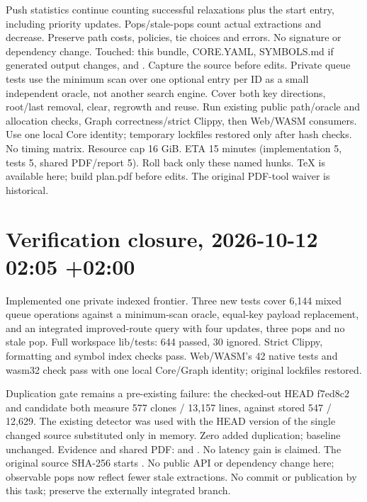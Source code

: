 \documentclass[11pt]{article}
\begin{document}
Push statistics continue counting successful relaxations plus the start entry,
including priority updates. Pops/stale-pops count actual extractions and decrease.
Preserve path costs, policies, tie choices and errors. No signature or dependency
change. Touched: this bundle, CORE.YAML, SYMBOLS.md if generated output changes,
and . Capture the source before edits.
Private queue tests use the minimum scan over one optional entry per ID as a
small independent oracle, not another search engine. Cover both key directions,
root/last removal, clear, regrowth and reuse. Run existing public path/oracle and
allocation checks, Graph correctness/strict Clippy, then Web/WASM consumers.
Use one local Core identity; temporary lockfiles restored only after hash checks.
No timing matrix. Resource cap 16 GiB. ETA 15 minutes (implementation 5, tests 5,
shared PDF/report 5). Roll back only these named hunks. TeX is available here;
build plan.pdf before edits. The original PDF-tool waiver is historical.

\section*{Verification closure, 2026-10-12 02:05 +02:00}
Implemented one private indexed frontier. Three new tests cover 6,144 mixed
queue operations against a minimum-scan oracle, equal-key payload replacement,
and an integrated improved-route query with four updates, three pops and no
stale pop. Full workspace lib/tests: 644 passed, 30 ignored. Strict Clippy,
formatting and symbol index checks pass. Web/WASM's 42 native tests and wasm32
check pass with one local Core/Graph identity; original lockfiles restored.

Duplication gate remains a pre-existing failure: the checked-out HEAD f7ed8c2 and
candidate both measure 577 clones / 13,157 lines, against stored 547 / 12,629.
The existing detector was used with the HEAD version of the single changed
source substituted only in memory. Zero added duplication; baseline unchanged.
Evidence and shared PDF:  and
. No latency gain is claimed.
The original source SHA-256 starts . No public API or
dependency change here; observable pops now reflect fewer stale extractions.
No commit or publication by this task; preserve the externally integrated branch.
\end{document}
